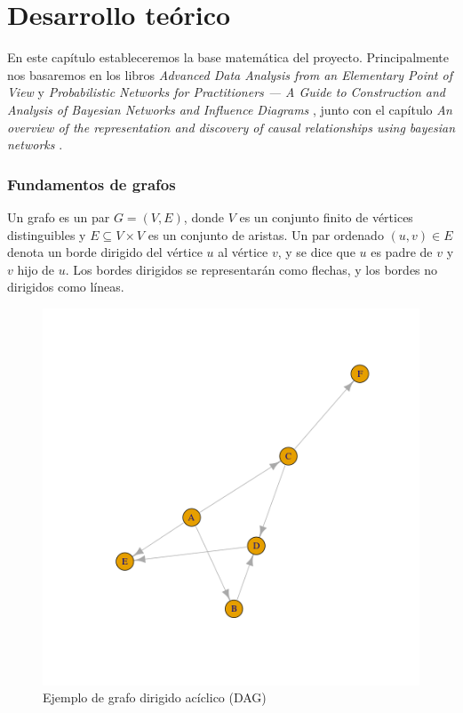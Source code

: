 \chapter{Desarrollo teórico}
En este capítulo estableceremos la base matemática del proyecto. Principalmente nos basaremos en 
los libros \textit{Advanced Data Analysis
from an Elementary Point of View} \cite{ada} y \textit{Probabilistic Networks for Practitioners — A
Guide to Construction and Analysis of Bayesian
Networks and Influence Diagrams} \cite{pgm}, junto con el capítulo \textit{An overview of the representation and 
discovery of causal relationships using bayesian networks} \cite{cooper}.

\subsection{Fundamentos de grafos}
Un grafo es un par $G = (V, E)$, donde $V$ es un conjunto finito de vértices distinguibles y 
$E \subseteq V \times V$ es un conjunto de aristas. Un par ordenado $(u, v) \in E$ denota un borde dirigido
del vértice $u$ al vértice $v$, y se dice que $u$ es padre de $v$ y $v$ hijo de $u$. Los bordes dirigidos 
se representarán como flechas, y los bordes no dirigidos como líneas. 

\begin{figure}[h!]
    \centering
     \includegraphics[width=\textwidth]{./img/dag.png}
     \caption{Ejemplo de grafo dirigido acíclico (DAG)}
     \label{img:dag1}
    \end{figure}

